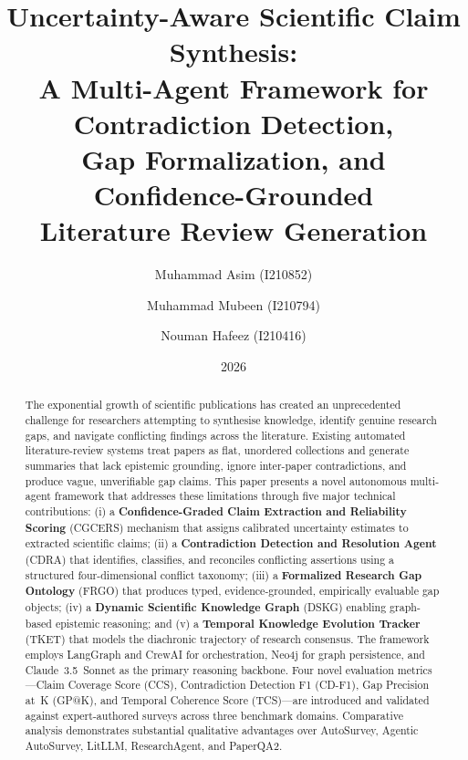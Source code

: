 \documentclass{llncs}
\title{Uncertainty-Aware Scientific Claim Synthesis:\\ A Multi-Agent Framework for Contradiction Detection,\\
Gap Formalization, and Confidence-Grounded\\Literature Review Generation}
\author{Muhammad Asim (I210852)\and Muhammad Mubeen (I210794)\and Nouman Hafeez (I210416)}
\institute{Department of Computer Science,\\
FAST National University of Computers and Emerging Sciences (NUCES),\\
Islamabad Campus, Islamabad, Pakistan\\
\texttt{\{i210852, i210794, i210416\}@nu.edu.pk}\\[4pt]
\textbf{Supervisor:} Dr.\ Akhtar Jamil}
\date{2026}
\begin{document}
\maketitle

\begin{abstract}
The exponential growth of scientific publications has created an unprecedented
challenge for researchers attempting to synthesise knowledge, identify genuine
research gaps, and navigate conflicting findings across the literature. Existing
automated literature-review systems treat papers as flat, unordered collections
and generate summaries that lack epistemic grounding, ignore inter-paper
contradictions, and produce vague, unverifiable gap claims. This paper presents
a novel autonomous multi-agent framework that addresses these limitations
through five major technical contributions: (i) a \textbf{Confidence-Graded Claim
Extraction and Reliability Scoring} (CGCERS) mechanism that assigns calibrated
uncertainty estimates to extracted scientific claims; (ii) a \textbf{Contradiction
Detection and Resolution Agent} (CDRA) that identifies, classifies, and reconciles
conflicting assertions using a structured four-dimensional conflict taxonomy;
(iii) a \textbf{Formalized Research Gap Ontology} (FRGO) that produces typed,
evidence-grounded, empirically evaluable gap objects; (iv) a \textbf{Dynamic
Scientific Knowledge Graph} (DSKG) enabling graph-based epistemic reasoning;
and (v) a \textbf{Temporal Knowledge Evolution Tracker} (TKET) that models the
diachronic trajectory of research consensus. The framework employs LangGraph
and CrewAI for orchestration, Neo4j for graph persistence, and Claude~3.5~Sonnet
as the primary reasoning backbone. Four novel evaluation metrics—Claim Coverage
Score (CCS), Contradiction Detection F1 (CD-F1), Gap Precision at~K (GP@K),
and Temporal Coherence Score (TCS)—are introduced and validated against
expert-authored surveys across three benchmark domains. Comparative analysis
demonstrates substantial qualitative advantages over AutoSurvey, Agentic
AutoSurvey, LitLLM, ResearchAgent, and PaperQA2.
\end{abstract}


\end{document}
